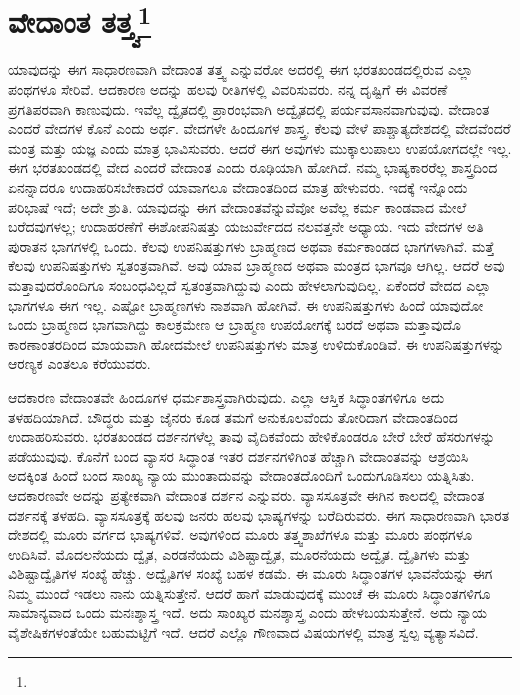 
\chapter[ವೇದಾಂತ ತತ್ತ್ವ]{ವೇದಾಂತ ತತ್ತ್ವ\protect\footnote{}}

ಯಾವುದನ್ನು ಈಗ ಸಾಧಾರಣವಾಗಿ ವೇದಾಂತ ತತ್ತ್ವ ಎನ್ನುವರೋ ಅದರಲ್ಲಿ ಈಗ ಭರತಖಂಡದಲ್ಲಿರುವ ಎಲ್ಲಾ ಪಂಥಗಳೂ ಸೇರಿವೆ. ಆದಕಾರಣ ಅದನ್ನು ಹಲವು ರೀತಿಗಳಲ್ಲಿ ವಿವರಿಸುವರು. ನನ್ನ ದೃಷ್ಟಿಗೆ ಈ ವಿವರಣೆ ಪ್ರಗತಿಪರವಾಗಿ ಕಾಣುವುದು. ಇವೆಲ್ಲ ದ್ವೈತದಲ್ಲಿ ಪ್ರಾರಂಭವಾಗಿ ಅದ್ವೈತದಲ್ಲಿ ಪರ್ಯವಸಾನವಾಗುವುವು. ವೇದಾಂತ ಎಂದರೆ ವೇದಗಳ ಕೊನೆ ಎಂದು ಅರ್ಥ. ವೇದಗಳೇ ಹಿಂದೂಗಳ ಶಾಸ್ತ್ರ. ಕೆಲವು ವೇಳೆ ಪಾಶ್ಚಾತ್ಯದೇಶದಲ್ಲಿ ವೇದವೆಂದರೆ ಮಂತ್ರ ಮತ್ತು ಯಜ್ಞ ಎಂದು ಮಾತ್ರ ಭಾವಿಸುವರು. ಆದರೆ ಈಗ ಅವುಗಳು ಮುಕ್ಕಾಲುಪಾಲು ಉಪಯೋಗದಲ್ಲೇ ಇಲ್ಲ. ಈಗ ಭರತಖಂಡದಲ್ಲಿ ವೇದ ಎಂದರೆ ವೇದಾಂತ ಎಂದು ರೂಢಿಯಾಗಿ ಹೋಗಿದೆ. ನಮ್ಮ ಭಾಷ್ಯಕಾರರೆಲ್ಲ ಶಾಸ್ತ್ರದಿಂದ ಏನನ್ನಾದರೂ ಉದಾಹರಿಸಬೇಕಾದರೆ ಯಾವಾಗಲೂ ವೇದಾಂತದಿಂದ ಮಾತ್ರ ಹೇಳುವರು. ಇದಕ್ಕೆ ಇನ್ನೊಂದು ಪರಿಭಾಷೆ ಇದೆ; ಅದೇ ಶ್ರುತಿ. ಯಾವುದನ್ನು ಈಗ ವೇದಾಂತವೆನ್ನುವೆವೋ ಅವೆಲ್ಲ ಕರ್ಮ ಕಾಂಡವಾದ ಮೇಲೆ ಬರೆದವುಗಳಲ್ಲ; ಉದಾಹರಣೆಗೆ ಈಶೋಪನಿಷತ್ತು ಯಜುರ್ವೇದದ ನಲವತ್ತನೇ ಅಧ್ಯಾಯ. ಇದು ವೇದಗಳ ಅತಿ ಪುರಾತನ ಭಾಗಗಳಲ್ಲಿ ಒಂದು. ಕೆಲವು ಉಪನಿಷತ್ತುಗಳು ಬ್ರಾಹ್ಮಣದ ಅಥವಾ ಕರ್ಮಕಾಂಡದ ಭಾಗಗಳಾಗಿವೆ. ಮತ್ತೆ ಕೆಲವು ಉಪನಿಷತ್ತುಗಳು ಸ್ವತಂತ್ರವಾಗಿವೆ. ಅವು ಯಾವ ಬ್ರಾಹ್ಮಣದ ಅಥವಾ ಮಂತ್ರದ ಭಾಗವೂ ಆಗಿಲ್ಲ. ಆದರೆ ಅವು ಮತ್ತಾವುದರೊಂದಿಗೂ ಸಂಬಂಧವಿಲ್ಲದೆ ಸ್ವತಂತ್ರವಾಗಿದ್ದುವು ಎಂದು ಹೇಳಲಾಗುವುದಿಲ್ಲ. ಏಕೆಂದರೆ ವೇದದ ಎಲ್ಲಾ ಭಾಗಗಳೂ ಈಗ ಇಲ್ಲ. ಎಷ್ಟೋ ಬ್ರಾಹ್ಮಣಗಳು ನಾಶವಾಗಿ ಹೋಗಿವೆ. ಈ ಉಪನಿಷತ್ತುಗಳು ಹಿಂದೆ ಯಾವುದೋ ಒಂದು ಬ್ರಾಹ್ಮಣದ ಭಾಗವಾಗಿದ್ದು ಕಾಲಕ್ರಮೇಣ ಆ ಬ್ರಾಹ್ಮಣ ಉಪಯೋಗಕ್ಕೆ ಬರದೆ ಅಥವಾ ಮತ್ತಾವುದೊ ಕಾರಣಾಂತರದಿಂದ ಮಾಯವಾಗಿ ಹೋದಮೇಲೆ ಉಪನಿಷತ್ತುಗಳು ಮಾತ್ರ ಉಳಿದುಕೊಂಡಿವೆ. ಈ ಉಪನಿಷತ್ತುಗಳನ್ನು ಆರಣ್ಯಕ ಎಂತಲೂ ಕರೆಯುವರು.

ಆದಕಾರಣ ವೇದಾಂತವೇ ಹಿಂದೂಗಳ ಧರ್ಮಶಾಸ್ತ್ರವಾಗಿರುವುದು. ಎಲ್ಲಾ ಆಸ್ತಿಕ ಸಿದ್ಧಾಂತಗಳಿಗೂ ಅದು ತಳಹದಿಯಾಗಿದೆ. ಬೌದ್ಧರು ಮತ್ತು ಜೈನರು ಕೂಡ ತಮಗೆ ಅನುಕೂಲವೆಂದು ತೋರಿದಾಗ ವೇದಾಂತದಿಂದ ಉದಾಹರಿಸುವರು. ಭರತಖಂಡದ ದರ್ಶನಗಳೆಲ್ಲ ತಾವು ವೈದಿಕವೆಂದು ಹೇಳಿಕೊಂಡರೂ ಬೇರೆ ಬೇರೆ ಹೆಸರುಗಳನ್ನು ಪಡೆಯುವುವು. ಕೊನೆಗೆ ಬಂದ ವ್ಯಾಸರ ಸಿದ್ಧಾಂತ ಇತರ ದರ್ಶನಗಳಿಗಿಂತ ಹೆಚ್ಚಾಗಿ ವೇದಾಂತವನ್ನು ಆಶ್ರಯಿಸಿ ಅದಕ್ಕಿಂತ ಹಿಂದೆ ಬಂದ ಸಾಂಖ್ಯ ನ್ಯಾಯ ಮುಂತಾದುವನ್ನು ವೇದಾಂತದೊಂದಿಗೆ ಒಂದುಗೂಡಿಸಲು ಯತ್ನಿಸಿತು. ಆದಕಾರಣವೇ ಅದನ್ನು ಪ್ರತ್ಯೇಕವಾಗಿ ವೇದಾಂತ ದರ್ಶನ ಎನ್ನುವರು. ವ್ಯಾಸಸೂತ್ರವೇ ಈಗಿನ ಕಾಲದಲ್ಲಿ ವೇದಾಂತ ದರ್ಶನಕ್ಕೆ ತಳಹದಿ. ವ್ಯಾಸಸೂತ್ರಕ್ಕೆ ಹಲವು ಜನರು ಹಲವು ಭಾಷ್ಯಗಳನ್ನು ಬರೆದಿರುವರು. ಈಗ ಸಾಧಾರಣವಾಗಿ ಭಾರತ ದೇಶದಲ್ಲಿ ಮೂರು ವರ್ಗದ ಭಾಷ್ಯಗಳಿವೆ. ಅವುಗಳಿಂದ ಮೂರು ತತ್ತ್ವಶಾಖೆಗಳೂ ಮತ್ತು ಮೂರು ಪಂಥಗಳೂ ಉದಿಸಿವೆ. ಮೊದಲನೆಯದು ದ್ವೈತ, ಎರಡನೆಯದು ವಿಶಿಷ್ಟಾದ್ವೈತ, ಮೂರನೆಯದು ಅದ್ವೈತ. ದ್ವೈತಿಗಳು ಮತ್ತು ವಿಶಿಷ್ಟಾದ್ವೈತಿಗಳ ಸಂಖ್ಯೆ ಹೆಚ್ಚು. ಅದ್ವೈತಿಗಳ ಸಂಖ್ಯೆ ಬಹಳ ಕಡಮೆ. ಈ ಮೂರು ಸಿದ್ಧಾಂತಗಳ ಭಾವನೆಯನ್ನು ಈಗ ನಿಮ್ಮ ಮುಂದೆ ಇಡಲು ನಾನು ಯತ್ನಿಸುತ್ತೇನೆ. ಆದರೆ ಹಾಗೆ ಮಾಡುವುದಕ್ಕೆ ಮುಂಚೆ ಈ ಮೂರು ಸಿದ್ಧಾಂತಗಳಿಗೂ ಸಾಮಾನ್ಯವಾದ ಒಂದು ಮನಃಶ್ಶಾಸ್ತ್ರ ಇದೆ. ಅದು ಸಾಂಖ್ಯರ ಮನಶ್ಶಾಸ್ತ್ರ ಎಂದು ಹೇಳಬಯಸುತ್ತೇನೆ. ಅದು ನ್ಯಾಯ ವೈಶೇಷಿಕಗಳಂತೆಯೇ ಬಹುಮಟ್ಟಿಗೆ ಇದೆ. ಆದರೆ ಎಲ್ಲೊ ಗೌಣವಾದ ವಿಷಯಗಳಲ್ಲಿ ಮಾತ್ರ ಸ್ವಲ್ಪ ವ್ಯತ್ಯಾಸವಿದೆ.

